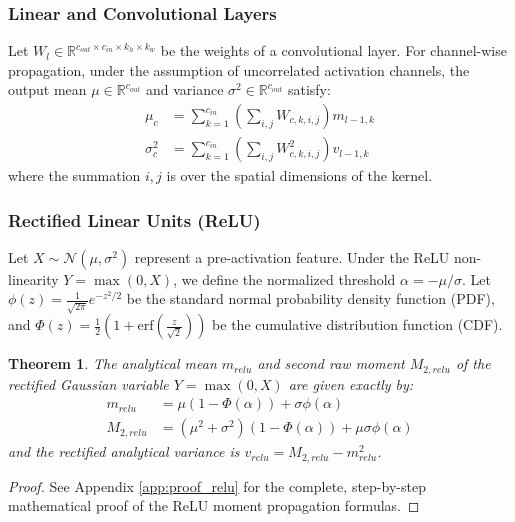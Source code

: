 \documentclass{article}
\theoremstyle{plain}
\newtheorem{theorem}{Theorem}[section]
\theoremstyle{definition}
\theoremstyle{remark}
\begin{document}
\subsubsection{Linear and Convolutional Layers}
Let $W_l \in \mathbb{R}^{c_{out} \times c_{in} \times k_h \times k_w}$ be the weights of a convolutional layer. For channel-wise propagation, under the assumption of uncorrelated activation channels, the output mean $\mu \in \mathbb{R}^{c_{out}}$ and variance $\sigma^2 \in \mathbb{R}^{c_{out}}$ satisfy:
\begin{align}
    \mu_c &= \sum_{k=1}^{c_{in}} \left( \sum_{i,j} W_{c, k, i, j} \right) m_{l-1, k} \\
    \sigma^2_c &= \sum_{k=1}^{c_{in}} \left( \sum_{i,j} W^2_{c, k, i, j} \right) v_{l-1, k}
\end{align}
where the summation $i, j$ is over the spatial dimensions of the kernel.

\subsubsection{Rectified Linear Units (ReLU)}
Let $X \sim \mathcal{N}(\mu, \sigma^2)$ represent a pre-activation feature. Under the ReLU non-linearity $Y = \max(0, X)$, we define the normalized threshold $\alpha = -\mu / \sigma$. Let $\phi(z) = \frac{1}{\sqrt{2\pi}}e^{-z^2/2}$ be the standard normal probability density function (PDF), and $\Phi(z) = \frac{1}{2}\left(1 + \text{erf}\left(\frac{z}{\sqrt{2}}\right)\right)$ be the cumulative distribution function (CDF).

\begin{theorem}
The analytical mean $m_{relu}$ and second raw moment $M_{2, relu}$ of the rectified Gaussian variable $Y = \max(0, X)$ are given exactly by:
\begin{align}
    m_{relu} &= \mu (1 - \Phi(\alpha)) + \sigma \phi(\alpha) \\
    M_{2, relu} &= (\mu^2 + \sigma^2)(1 - \Phi(\alpha)) + \mu \sigma \phi(\alpha)
\end{align}
and the rectified analytical variance is $v_{relu} = M_{2, relu} - m_{relu}^2$.
\end{theorem}

\begin{proof}
See Appendix \ref{app:proof_relu} for the complete, step-by-step mathematical proof of the ReLU moment propagation formulas.
\end{proof}
\end{document}
